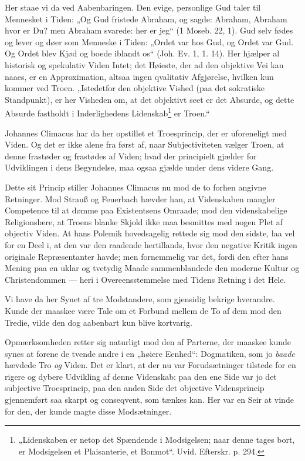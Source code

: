\documentclass[12pt,a4paper]{book}
\newcommand{\opage}[1]{\marginnote{\footnotesize\textit{[#1]}}}
\begin{document}
Her staae vi da ved Aabenbaringen. Den evige, personlige Gud taler til Mennesket i Tiden: „Og Gud fristede Abraham, og sagde: Abraham, Abraham hvor er Du? men Abraham svarede: her er jeg“ (1 Moseb. 22, 1). Gud selv fødes og lever og døer som Menneske i Tiden: „Ordet var hos Gud, og Ordet var Gud. Og Ordet blev Kjød og boede iblandt os“ (Joh. Ev. 1, 1. 14). Her hjælper al historisk og spekulativ Viden Intet; det Høieste, der ad den objektive Vei
\opage{24}\setcounter{footnote}{0}%
kan naaes, er en Approximation, altsaa ingen qvalitativ Afgjørelse, hvilken kun kommer ved Troen. „Istedetfor den objektive Vished (paa det sokratiske Standpunkt), er her Visheden om, at det objektivt seet er det Absurde, og dette Absurde fastholdt i Inderlighedens Lidenskab\footnote{„Lidenskaben er netop det Spændende i Modsigelsen; naar denne tages bort, er Modsigelsen et Plaisanterie, et Bonmot“. Uvid. Efterskr. p. 294.} er Troen.“

Johannes Climacus har da her opstillet et Troesprincip, der er uforeneligt med Viden. Og det er ikke alene fra først af, naar Subjectiviteten vælger Troen, at denne frastøder og frastødes af Viden; hvad der principielt gjælder for Udviklingen i dens Begyndelse, maa ogsaa gjælde under dens videre Gang.

Dette sit Princip stiller Johannes Climacus nu mod de to forhen angivne Retninger. Mod Strauß og Feuerbach hævder han, at Videnskaben mangler Competence til at dømme paa Existentsens Omraade; mod den videnskabelige Religionslære, at Troens blanke Skjold ikke maa besmittes med nogen Plet af objectiv Viden. At hans Polemik hovedsagelig rettede sig mod den sidste, laa vel for en Deel i, at den var den raadende hertillands, hvor den negative Kritik ingen originale Repræsentanter havde; men fornemmelig var det, fordi den efter hans Mening paa en uklar og tvetydig Maade sammenblandede den moderne Kultur og Christendommen --- heri i Overeensstemmelse med Tidens Retning i det Hele.

Vi have da her Synet af tre Modstandere, som gjensidig bekrige hverandre. Kunde der maaskee være Tale om et Forbund mellem de To af dem mod den Tredie, vilde den dog aabenbart kun blive kortvarig.

Opmærksomheden retter sig naturligt mod den af Parterne, der maaskee kunde synes at forene de tvende andre i en „høiere Eenhed“: Dogmatiken, som jo \emph{baade} hævdede Tro \emph{og} Viden. Det er klart, at der nu var Forudsætninger tilstede for en
\opage{25}\setcounter{footnote}{0}%
rigere og dybere Udvikling af denne Videnskab: paa den ene Side var jo det subjective Troesprincip, paa den anden Side det objective Vidensprincip gjennemført saa skarpt og conseqvent, som tænkes kan. Her var en Seir at vinde for den, der kunde magte disse Modsætninger.
\end{document}
